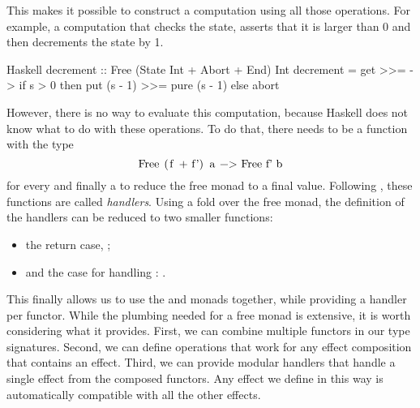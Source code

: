 This makes it possible to construct a computation using all those operations. For example, a computation that checks the state, asserts that it is larger than 0 and then decrements the state by 1.

\begin{lst}{Haskell}
decrement :: Free (State Int + Abort + End) Int
decrement = get >>= \s ->
              if s > 0
              then put (s - 1) >>= pure (s - 1)
              else abort 
\end{lst}

However, there is no way to evaluate this computation, because Haskell does not know what to do with these operations. To do that, there needs to be a function with the type
\[\mcode{Free (f + f') a -> Free f' b}\]
for every  and finally a  to reduce the free monad to a final value. Following \textcite{castagna_handlers_2009}, these functions are called \emph{handlers}. Using a fold over the free monad, the definition of the handlers can be reduced to two smaller functions:
\begin{itemize}
    \item the return case, ;
    \item and the case for handling : .
\end{itemize}


This finally allows us to use the  and  monads together, while providing a handler per functor. While the plumbing needed for a free monad is extensive, it is worth considering what it provides. First, we can combine multiple functors in our type signatures. Second, we can define operations that work for any effect composition that contains an effect. Third, we can provide modular handlers that handle a single effect from the composed functors. Any effect we define in this way is automatically compatible with all the other effects.

